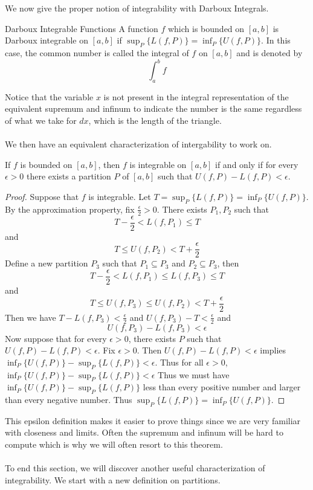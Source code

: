 We now give the proper notion of integrability with Darboux Integrals. 

\begin{defn}{Darboux Integrable Functions}{} A function $f$ which is bounded on $[a,b]$ is Darboux integrable on $[a,b]$ if $\sup_P\{L(f,P)\}=\inf_P\{U(f,P)\}$. In this case, the common number is called the integral of $f$ on $[a,b]$ and is denoted by $$\int_{a}^{b}f$$
\end{defn}

Notice that the variable $x$ is not present in the integral representation of the equivalent supremum and infinum to indicate the number is the same regardless of what we take for $dx$, which is the length of the triangle. \\~\\
We then have an equivalent characterization of intergability to work on. 

\begin{thm}{}{} If $f$ is bounded on $[a,b]$, then $f$ is integrable on $[a,b]$ if and only if for every $\epsilon>0$ there exists a partition $P$ of $[a,b]$ such that $U(f,P)-L(f,P)<\epsilon$. \tcbline
\begin{proof} Suppose that $f$ is integrable. Let $T=\sup_P\{L(f,P)\}=\inf_P\{U(f,P)\}$. By the approximation property, fix $\frac{\epsilon}{2}>0$. There exists $P_1,P_2$ such that $$T-\frac{\epsilon}{2}<L(f,P_1)\leq T$$ and $$T\leq U(f,P_2)<T+\frac{\epsilon}{2}$$ Define a new partition $P_3$ such that $P_1\subseteq P_3$ and $P_2\subseteq P_3$, then $$T-\frac{\epsilon}{2}<L(f,P_1)\leq L(f,P_3)\leq T$$ and $$T\leq U(f,P_3)\leq U(f,P_2)<T+\frac{\epsilon}{2}$$ Then we have $T-L(f,P_3)<\frac{\epsilon}{2}$ and $U(f,P_3)-T<\frac{\epsilon}{2}$ and $$U(f,P_3)-L(f,P_3)<\epsilon$$
Now suppose that for every $\epsilon>0$, there exists $P$ such that $U(f,P)-L(f,P)<\epsilon$. Fix $\epsilon>0$. Then $U(f,P)-L(f,P)<\epsilon$ implies $\inf_P\{U(f,P)\}-\sup_P\{L(f,P)\}<\epsilon$. Thus for all $\epsilon>0$, $\inf_P\{U(f,P)\}-\sup_P\{L(f,P)\}<\epsilon$ Thus we must have $\inf_P\{U(f,P)\}-\sup_P\{L(f,P)\}$ less than every positive number and larger than every negative number. Thus $\sup_P\{L(f,P)\}=\inf_P\{U(f,P)\}$. 
\end{proof}
\end{thm}

This epsilon definition makes it easier to prove things since we are very familiar with closeness and limits. Often the supremum and infinum will be hard to compute which is why we will often resort to this theorem. \\~\\
To end this section, we will discover another useful characterization of integrability. We start with a new definition on partitions. 

